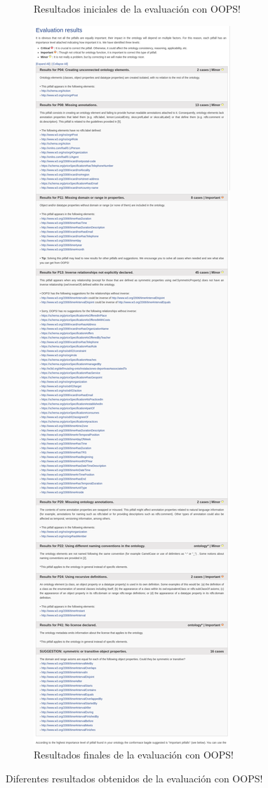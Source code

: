 \documentclass[a4paper,12pt]{article}
\begin{document}
\begin{figure}[H]
\begin{subfigure}{.5\textwidth}
			\caption{Resultados iniciales de la evaluación con OOPS! }
		\end{subfigure}
		\begin{subfigure}{.5\textwidth}
			\centering
			\includegraphics[height=\textheight]{include/eval_final_oops.png}
			\caption{Resultados finales de la evaluación con OOPS!}
		\end{subfigure}
		\caption{Diferentes resultados obtenidos de la evaluación con OOPS!}
	\end{figure}
	
\end{document}
